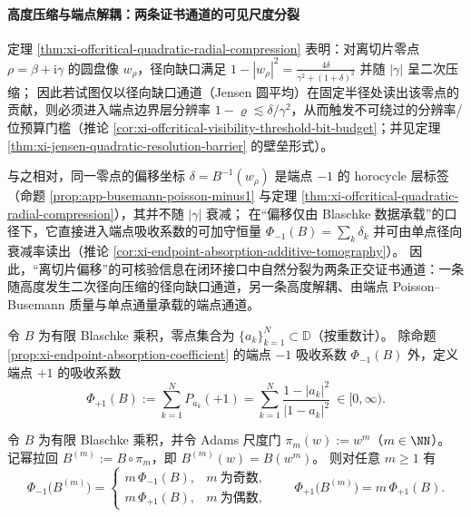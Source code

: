 

\paragraph{高度压缩与端点解耦：两条证书通道的可见尺度分裂}
定理 \ref{thm:xi-offcritical-quadratic-radial-compression} 表明：对离切片零点 \(\rho=\beta+\mathrm{i}\gamma\) 的圆盘像 \(w_\rho\)，径向缺口满足
\(
1-|w_\rho|^2=\frac{4\delta}{\gamma^2+(1+\delta)^2}
\)
并随 \(|\gamma|\) 呈二次压缩；
因此若试图仅以径向缺口通道（Jensen 圆平均）在固定半径处读出该零点的贡献，则必须进入端点边界层分辨率 \(1-\varrho\lesssim \delta/\gamma^2\)，从而触发不可绕过的分辨率/位预算门槛（推论 \ref{cor:xi-offcritical-visibility-threshold-bit-budget}；并见定理 \ref{thm:xi-jensen-quadratic-resolution-barrier} 的壁垒形式）。
\par
与之相对，同一零点的偏移坐标 \(\delta=B^{-1}(w_\rho)\) 是端点 \(-1\) 的 horocycle 层标签（命题 \ref{prop:app-busemann-poisson-minus1} 与定理 \ref{thm:xi-offcritical-quadratic-radial-compression}），其并不随 \(|\gamma|\) 衰减；
在“偏移仅由 Blaschke 数据承载”的口径下，它直接进入端点吸收系数的可加守恒量 \(\Phi_{-1}(B)=\sum_k \delta_k\) 并可由单点径向衰减率读出（推论 \ref{cor:xi-endpoint-absorption-additive-tomography}）。
因此，“离切片偏移”的可核验信息在闭环接口中自然分裂为两条正交证书通道：一条随高度发生二次径向压缩的径向缺口通道，另一条高度解耦、由端点 Poisson--Busemann 质量与单点通量承载的端点通道。

\begin{definition}[两端点吸收系数]\label{def:xi-endpoint-two-absorption-coefficients}
令 \(B\) 为有限 Blaschke 乘积，零点集合为 \(\{a_k\}_{k=1}^{N}\subset\mathbb{D}\)（按重数计）。
除命题 \ref{prop:xi-endpoint-absorption-coefficient} 的端点 \(-1\) 吸收系数 \(\Phi_{-1}(B)\) 外，定义端点 \(+1\) 的吸收系数
\[
\Phi_{+1}(B):=\sum_{k=1}^{N}P_{a_k}(+1)=\sum_{k=1}^{N}\frac{1-|a_k|^2}{|1-a_k|^2}\ \in[0,\infty).
\]
\end{definition}

\begin{theorem}\label{thm:xi-endpoint-absorption-adams-rescaling}
令 \(B\) 为有限 Blaschke 乘积，并令 Adams 尺度门 \(\pi_m(w):=w^m\)（\(m\in\NN\)）。
记幂拉回 \(B^{(m)}:=B\circ\pi_m\)，即 \(B^{(m)}(w)=B(w^m)\)。
则对任意 \(m\ge 1\) 有
\[
\boxed{\;
\Phi_{-1}\bigl(B^{(m)}\bigr)=
\begin{cases}
m\,\Phi_{-1}(B),& m\ \text{为奇数},\\[2pt]
m\,\Phi_{+1}(B),& m\ \text{为偶数},
\end{cases}
\qquad
\Phi_{+1}\bigl(B^{(m)}\bigr)=m\,\Phi_{+1}(B).\;}
\]
\end{theorem}

